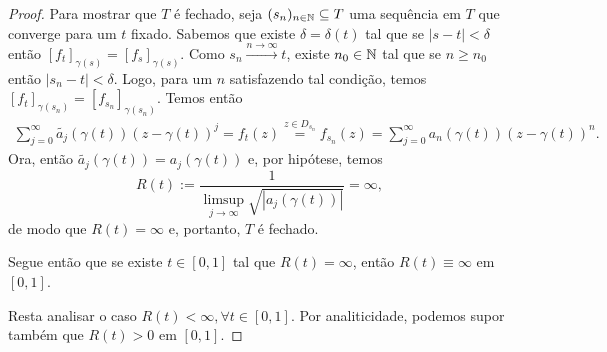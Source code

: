 \begin{proof}
        Para mostrar que $T$ é fechado, seja $(s_n)_{n\in\mathbb{N}}\subseteq T$ uma
        sequência em $T$ que converge para um $t$ fixado. Sabemos que existe 
        $\delta = \delta(t)$ tal que se $|s-t|<\delta$ então 
        $[f_t]_{\gamma(s)} = [f_s]_{\gamma(s)}$. Como $s_n\xrightarrow{n\to\infty} t$,
        existe $n_0\in\mathbb{N}$ tal que se $n\geq n_0$ então $|s_n - t|<\delta$.
        Logo, para um $n$ satisfazendo tal condição, temos
        $[f_t]_{\gamma(s_n)} = [f_{s_n}]_{\gamma(s_n)}$. Temos então
        \begin{align*}
            \sum_{j=0}^\infty \widetilde{a_j}(\gamma(t))(z-\gamma(t))^j
            =
            f_t(z)
            \stackrel{z\in D_{s_n}}{=}
            f_{s_n}(z)
            =
            \sum_{j=0}^\infty a_n(\gamma(t))(z-\gamma(t))^n.
        \end{align*}
        Ora, então $\widetilde{a_j}(\gamma(t)) = a_j(\gamma(t))$ e, por hipótese, temos
        \begin{equation*}
            R(t) := \frac{1}{\displaystyle{\limsup_{j\to\infty}} \sqrt{ |a_j(\gamma(t))| } } 
            = \infty,
        \end{equation*}
        de modo que $R(t) = \infty$ e, portanto, $T$ é fechado.
        
        Segue então que se existe $t\in [0,1]$ tal que $R(t) = \infty$, então
        $R(t) \equiv\infty$ em $[0,1]$.
        
        Resta analisar o caso $R(t) < \infty, \forall t\in[0,1]$. Por analiticidade, podemos
        supor também que $R(t) > 0$ em $[0,1]$.
        

\end{proof}
